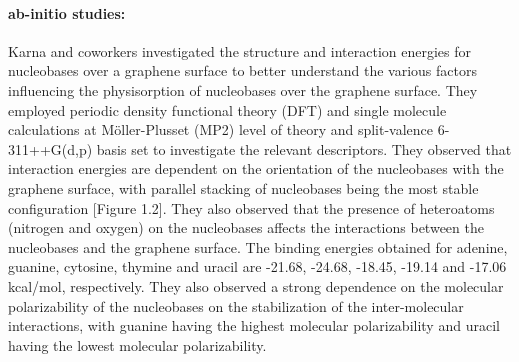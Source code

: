 \paragraph{ab-initio studies:} Karna and coworkers investigated the structure and interaction energies for nucleobases over a graphene surface to better understand the various factors influencing the physisorption of nucleobases over the graphene surface.\supercite{gowtham_physisorption_2007} They employed periodic density functional theory (DFT) and single molecule calculations at M\"{o}ller-Plusset (MP2) level of theory and split-valence 6-311++G(d,p) basis set to investigate the relevant descriptors. They observed that interaction energies are dependent on the orientation of the nucleobases with the graphene surface, with parallel stacking of nucleobases being the most stable configuration [Figure 1.2]. They also observed that the presence of heteroatoms (nitrogen and oxygen) on the nucleobases affects the interactions between the nucleobases and the graphene surface. The binding energies obtained for adenine, guanine, cytosine, thymine and uracil are -21.68, -24.68, -18.45, -19.14 and -17.06 kcal/mol, respectively. They also observed a strong dependence on the molecular polarizability of the nucleobases on the stabilization of the inter-molecular interactions, with guanine having the highest molecular polarizability and uracil having the lowest molecular polarizability.

